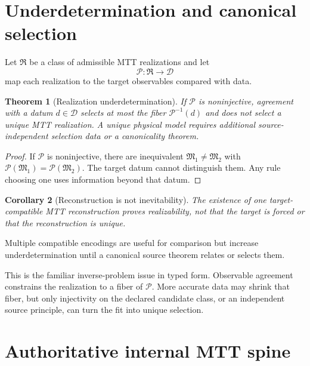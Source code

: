 \documentclass[11pt]{article}
\newtheorem{theorem}{Theorem}[section]
\newtheorem{corollary}[theorem]{Corollary}
\begin{document}
\section{Underdetermination and canonical selection}

Let $\mathfrak R$ be a class of admissible MTT realizations and let
\[
 \mathcal P:\mathfrak R\to\mathcal D
\]
map each realization to the target observables compared with data.

\begin{theorem}[Realization underdetermination]\label{thm:under}
If $\mathcal P$ is noninjective, agreement with a datum $d\in\mathcal D$
selects at most the fiber $\mathcal P^{-1}(d)$ and does not select a unique MTT
realization. A unique physical model requires additional source-independent
selection data or a canonicality theorem.
\end{theorem}

\begin{proof}
If $\mathcal P$ is noninjective, there are inequivalent
$\mathfrak M_1\ne\mathfrak M_2$ with
$\mathcal P(\mathfrak M_1)=\mathcal P(\mathfrak M_2)$. The target datum cannot
distinguish them. Any rule choosing one uses information beyond that datum.
\end{proof}

\begin{corollary}[Reconstruction is not inevitability]
The existence of one target-compatible MTT reconstruction proves realizability,
not that the target is forced or that the reconstruction is unique.
\end{corollary}

Multiple compatible encodings are useful for comparison but increase
underdetermination until a canonical source theorem relates or selects them.

This is the familiar inverse-problem issue in typed form.  Observable agreement
constrains the realization to a fiber of $\mathcal P$.  More accurate data may
shrink that fiber, but only injectivity on the declared candidate class, or an
independent source principle, can turn the fit into unique selection.

\section{Authoritative internal MTT spine}
\end{document}
